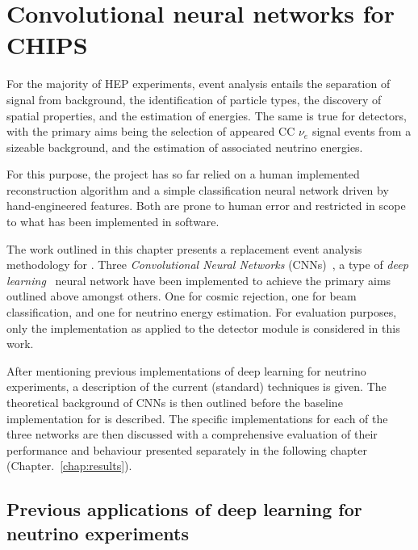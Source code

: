 \chapter{Convolutional neural networks for CHIPS} %
\label{chap:cnn} %

For the majority of HEP experiments, event analysis entails the separation of signal from
background, the identification of particle types, the discovery of spatial properties, and the
estimation of energies. The same is true for \chips detectors, with the primary aims being the
selection of appeared CC $\nu_{e}$ signal events from a sizeable background, and the estimation of
associated neutrino energies.

For this purpose, the \chips project has so far relied on a human implemented reconstruction
algorithm and a simple classification neural network driven by hand-engineered features. Both are
prone to human error and restricted in scope to what has been implemented in software.

The work outlined in this chapter presents a replacement event analysis methodology for \chips.
Three \emph{Convolutional Neural Networks} (CNNs)~\cite{fukushima1982}, a type of \emph{deep
learning}~\cite{goodfellow2016} neural network have been implemented to achieve the primary aims
outlined above amongst others. One for cosmic rejection, one for beam classification, and one for
neutrino energy estimation. For evaluation purposes, only the implementation as applied to the
\chipsfive detector module is considered in this work.

After mentioning previous implementations of deep learning for neutrino experiments, a description
of the current (standard) techniques is given. The theoretical background of CNNs is then outlined
before the baseline implementation for \chips is described. The specific implementations for each
of the three networks are then discussed with a comprehensive evaluation of their performance and
behaviour presented separately in the following chapter (Chapter.~\ref{chap:results}).

\section{Previous applications of deep learning for neutrino experiments} %
\label{sec:cnn_previous} %

